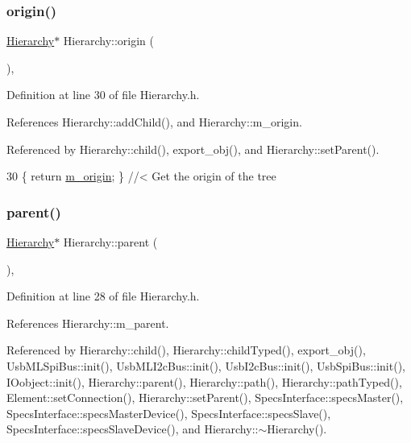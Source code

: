 \subsubsection{\texorpdfstring{origin()}{origin()}}
{\footnotesize\ttfamily \hyperlink{classHierarchy}{Hierarchy}$\ast$ Hierarchy\+::origin (\begin{DoxyParamCaption}{ }\end{DoxyParamCaption})\hspace{0.3cm}{\ttfamily [inline]}, {\ttfamily [inherited]}}



Definition at line 30 of file Hierarchy.\+h.



References Hierarchy\+::add\+Child(), and Hierarchy\+::m\+\_\+origin.



Referenced by Hierarchy\+::child(), export\+\_\+obj(), and Hierarchy\+::set\+Parent().


\begin{DoxyCode}
30 \{ \textcolor{keywordflow}{return} \hyperlink{classHierarchy_a16c73e557d3a7c156ffb5dc4102d148e}{m\_origin}; \}  \textcolor{comment}{//< Get the origin of the tree}
\end{DoxyCode}
\mbox{\label{classHierarchy_a1c7bec8257e717f9c1465e06ebf845fc}} 
\subsubsection{\texorpdfstring{parent()}{parent()}\hspace{0.1cm}{\footnotesize\ttfamily [1/2]}}
{\footnotesize\ttfamily \hyperlink{classHierarchy}{Hierarchy}$\ast$ Hierarchy\+::parent (\begin{DoxyParamCaption}{ }\end{DoxyParamCaption})\hspace{0.3cm}{\ttfamily [inline]}, {\ttfamily [inherited]}}



Definition at line 28 of file Hierarchy.\+h.



References Hierarchy\+::m\+\_\+parent.



Referenced by Hierarchy\+::child(), Hierarchy\+::child\+Typed(), export\+\_\+obj(), Usb\+M\+L\+Spi\+Bus\+::init(), Usb\+M\+L\+I2c\+Bus\+::init(), Usb\+I2c\+Bus\+::init(), Usb\+Spi\+Bus\+::init(), I\+Oobject\+::init(), Hierarchy\+::parent(), Hierarchy\+::path(), Hierarchy\+::path\+Typed(), Element\+::set\+Connection(), Hierarchy\+::set\+Parent(), Specs\+Interface\+::specs\+Master(), Specs\+Interface\+::specs\+Master\+Device(), Specs\+Interface\+::specs\+Slave(), Specs\+Interface\+::specs\+Slave\+Device(), and Hierarchy\+::$\sim$\+Hierarchy().


